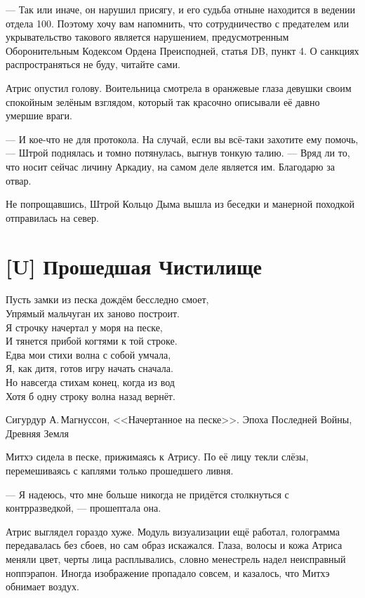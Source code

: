 --- Так или иначе, он нарушил присягу, и его судьба отныне находится в ведении отдела 100.
Поэтому хочу вам напомнить, что сотрудничество с предателем или укрывательство такового является нарушением, предусмотренным Оборонительным Кодексом Ордена Преисподней, статья DB, пункт 4.
О санкциях распространяться не буду, читайте сами.

Атрис опустил голову.
Воительница смотрела в оранжевые глаза девушки своим спокойным зелёным взглядом, который так красочно описывали её давно умершие враги.

--- И кое-что не для протокола.
На случай, если вы всё-таки захотите ему помочь, --- Штрой поднялась и томно потянулась, выгнув тонкую талию.
--- Вряд ли то, что носит сейчас личину Аркадиу, на самом деле является им.
Благодарю за отвар.

Не попрощавшись, Штрой Кольцо Дыма вышла из беседки и манерной походкой отправилась на север.

\section{[U] Прошедшая Чистилище}

\epigraph
{Пусть замки из песка дождём бесследно смоет,\\
Упрямый мальчуган их заново построит.\\
Я строчку начертал у моря на песке,\\
И тянется прибой когтями к той строке.\\
Едва мои стихи волна с собой умчала,\\
Я, как дитя, готов игру начать сначала.\\
Но навсегда стихам конец, когда из вод\\
Хотя б одну строку волна назад вернёт.}
{Сигурдур А.\,Магнуссон, <<Начертанное на песке>>.
Эпоха Последней Войны, Древняя Земля}

Митхэ сидела в песке, прижимаясь к Атрису.
По её лицу текли слёзы, перемешиваясь с каплями только прошедшего ливня.

--- Я надеюсь, что мне больше никогда не придётся столкнуться с контрразведкой, --- прошептала она.

Атрис выглядел гораздо хуже.
Модуль визуализации ещё работал, голограмма передавалась без сбоев, но сам образ искажался.
Глаза, волосы и кожа Атриса меняли цвет, черты лица расплывались, словно менестрель надел неисправный ноппэрапон\FM.
Иногда изображение пропадало совсем, и казалось, что Митхэ обнимает воздух.

